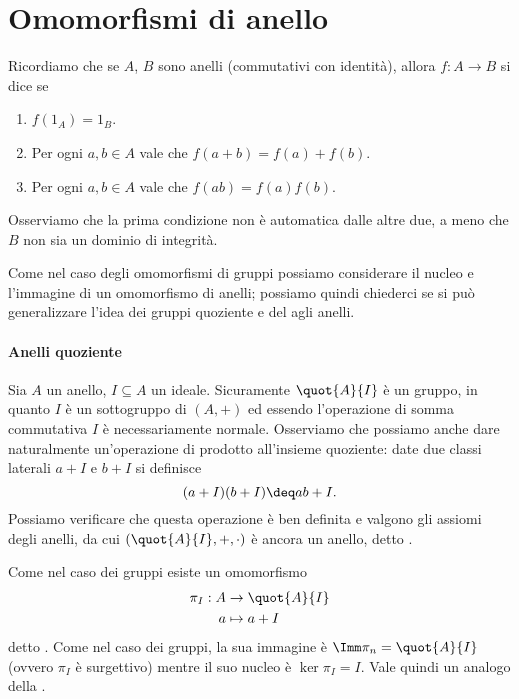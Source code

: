 \section{Omomorfismi di anello}

Ricordiamo che se $A$, $B$ sono anelli (commutativi con identità), allora $f : A \to B$ si dice  se 
\begin{enumerate}[label={(\arabic*)}]
    \item $f(1_A) = 1_B$.
    \item Per ogni $a, b \in A$ vale che $f(a + b) = f(a) + f(b)$.
    \item Per ogni $a, b \in A$ vale che $f(ab) = f(a)f(b)$.
\end{enumerate}

Osserviamo che la prima condizione non è automatica dalle altre due, a meno che $B$ non sia un dominio di integrità.

Come nel caso degli omomorfismi di gruppi possiamo considerare il nucleo e l'immagine di un omomorfismo di anelli; possiamo quindi chiederci se si può generalizzare l'idea dei gruppi quoziente e del  agli anelli.

\paragraph{Anelli quoziente}

Sia $A$ un anello, $I \subseteq A$ un ideale. Sicuramente $\quot{A}{I}$ è un gruppo, in quanto $I$ è un sottogruppo di $(A, +)$ ed essendo l'operazione di somma commutativa $I$ è necessariamente normale. Osserviamo che possiamo anche dare naturalmente un'operazione di prodotto all'insieme quoziente: date due classi laterali $a + I$ e $b + I$ si definisce \[
    (a+I)(b+I) \deq ab + I.    
\] Possiamo verificare che questa operazione è ben definita e valgono gli assiomi degli anelli, da cui $(\quot{A}{I}, +, \cdot)$ è ancora un anello, detto .

Come nel caso dei gruppi esiste un omomorfismo \begin{align*}
    \pi_I : A &\to \quot{A}{I}    \\
    a &\mapsto a + I
\end{align*} detto . Come nel caso dei gruppi, la sua immagine è $\Imm \pi_n = \quot{A}{I}$ (ovvero $\pi_I$ è surgettivo) mentre il suo nucleo è $\ker \pi_I = I$. Vale quindi un analogo della .

